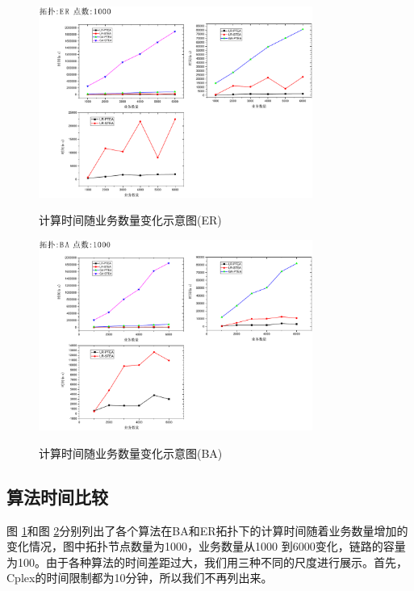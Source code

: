 \begin{figure}
\setlength{\abovecaptionskip}{-0.5cm}
\begin{center}
{\includegraphics[width=0.8\textwidth]{figures/TI-ER-TA-1000.pdf}}
\end{center}
\caption{{\footnotesize{计算时间随业务数量变化示意图(ER)}}}
\label{TI-ER-TA-1000}
\end{figure}
\begin{figure} 
\setlength{\abovecaptionskip}{-0.5cm}
\begin{center}
{\includegraphics[width=0.8\textwidth]{figures/TI-BA-TA-1000.pdf}}
\end{center}
\caption{{\footnotesize{计算时间随业务数量变化示意图(BA)}}}
\label{TI-BA-TA-1000}
\end{figure}

\subsection{算法时间比较}
图 \ref{TI-ER-TA-1000}和图 \ref{TI-BA-TA-1000}分别列出了各个算法在BA和ER拓扑下的计算时间随着业务数量增加的变化情况，图中拓扑节点数量为1000，业务数量从1000 到6000变化，链路的容量为100。由于各种算法的时间差距过大，我们用三种不同的尺度进行展示。首先，Cplex的时间限制都为10分钟，所以我们不再列出来。

